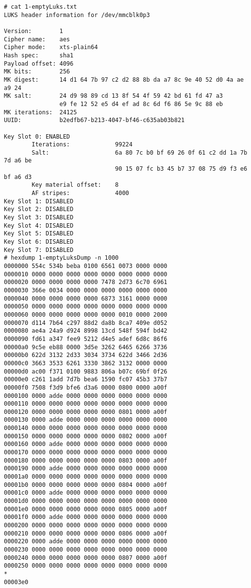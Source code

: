 \begin{lstlisting}[style=Bash]
# cat 1-emptyLuks.txt 
LUKS header information for /dev/mmcblk0p3

Version:        1
Cipher name:    aes
Cipher mode:    xts-plain64
Hash spec:      sha1
Payload offset: 4096
MK bits:        256
MK digest:      14 d1 64 7b 97 c2 d2 88 8b da a7 8c 9e 40 52 d0 4a ae a9 24 
MK salt:        24 d9 98 89 cd 13 8f 54 4f 59 42 bd 61 fd 47 a3 
                e9 fe 12 52 e5 d4 ef ad 8c 6d f6 86 5e 9c 88 eb 
MK iterations:  24125
UUID:           b2edfb67-b213-4047-bf46-c635ab03b821

Key Slot 0: ENABLED
        Iterations:             99224
        Salt:                   6a 80 7c b0 bf 69 26 0f 61 c2 dd 1a 7b 7d a6 be 
                                90 15 07 fc b3 45 b7 37 08 75 d9 f3 e6 bf a6 d3 
        Key material offset:    8
        AF stripes:             4000
Key Slot 1: DISABLED
Key Slot 2: DISABLED
Key Slot 3: DISABLED
Key Slot 4: DISABLED
Key Slot 5: DISABLED
Key Slot 6: DISABLED
Key Slot 7: DISABLED
# hexdump 1-emptyLuksDump -n 1000
0000000 554c 534b beba 0100 6561 0073 0000 0000
0000010 0000 0000 0000 0000 0000 0000 0000 0000
0000020 0000 0000 0000 0000 7478 2d73 6c70 6961
0000030 366e 0034 0000 0000 0000 0000 0000 0000
0000040 0000 0000 0000 0000 6873 3161 0000 0000
0000050 0000 0000 0000 0000 0000 0000 0000 0000
0000060 0000 0000 0000 0000 0000 0010 0000 2000
0000070 d114 7b64 c297 88d2 da8b 8ca7 409e d052
0000080 ae4a 24a9 d924 8998 13cd 548f 594f bd42
0000090 fd61 a347 fee9 5212 d4e5 adef 6d8c 86f6
00000a0 9c5e eb88 0000 3d5e 3262 6465 6266 3736
00000b0 622d 3132 2d33 3034 3734 622d 3466 2d36
00000c0 3663 3533 6261 3330 3862 3132 0000 0000
00000d0 ac00 f371 0100 9883 806a b07c 69bf 0f26
00000e0 c261 1add 7d7b bea6 1590 fc07 45b3 37b7
00000f0 7508 f3d9 bfe6 d3a6 0000 0800 0000 a00f
0000100 0000 adde 0000 0000 0000 0000 0000 0000
0000110 0000 0000 0000 0000 0000 0000 0000 0000
0000120 0000 0000 0000 0000 0000 0801 0000 a00f
0000130 0000 adde 0000 0000 0000 0000 0000 0000
0000140 0000 0000 0000 0000 0000 0000 0000 0000
0000150 0000 0000 0000 0000 0000 0802 0000 a00f
0000160 0000 adde 0000 0000 0000 0000 0000 0000
0000170 0000 0000 0000 0000 0000 0000 0000 0000
0000180 0000 0000 0000 0000 0000 0803 0000 a00f
0000190 0000 adde 0000 0000 0000 0000 0000 0000
00001a0 0000 0000 0000 0000 0000 0000 0000 0000
00001b0 0000 0000 0000 0000 0000 0804 0000 a00f
00001c0 0000 adde 0000 0000 0000 0000 0000 0000
00001d0 0000 0000 0000 0000 0000 0000 0000 0000
00001e0 0000 0000 0000 0000 0000 0805 0000 a00f
00001f0 0000 adde 0000 0000 0000 0000 0000 0000
0000200 0000 0000 0000 0000 0000 0000 0000 0000
0000210 0000 0000 0000 0000 0000 0806 0000 a00f
0000220 0000 adde 0000 0000 0000 0000 0000 0000
0000230 0000 0000 0000 0000 0000 0000 0000 0000
0000240 0000 0000 0000 0000 0000 0807 0000 a00f
0000250 0000 0000 0000 0000 0000 0000 0000 0000
*
00003e0
\end{lstlisting}

